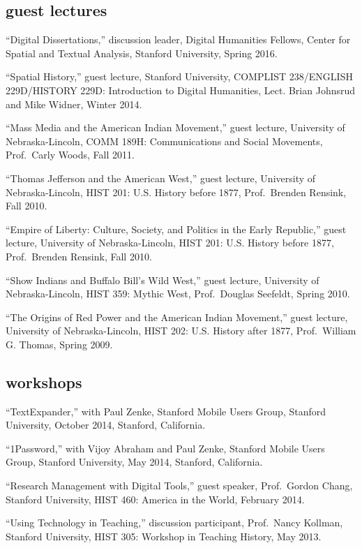 \subsection{guest lectures}\label{guest-lectures}

``Digital Dissertations,'' discussion leader, Digital Humanities
Fellows, Center for Spatial and Textual Analysis, Stanford University,
Spring 2016.

``Spatial History,'' guest lecture, Stanford University, COMPLIST
238/ENGLISH 229D/HISTORY 229D: Introduction to Digital Humanities, Lect.
Brian Johnsrud and Mike Widner, Winter 2014.

``Mass Media and the American Indian Movement,'' guest lecture,
University of Nebraska-Lincoln, COMM 189H: Communications and Social
Movements, Prof.~Carly Woods, Fall 2011.

``Thomas Jefferson and the American West,'' guest lecture, University of
Nebraska-Lincoln, HIST 201: U.S. History before 1877, Prof.~Brenden
Rensink, Fall 2010.

``Empire of Liberty: Culture, Society, and Politics in the Early
Republic,'' guest lecture, University of Nebraska-Lincoln, HIST 201:
U.S. History before 1877, Prof.~Brenden Rensink, Fall 2010.

``Show Indians and Buffalo Bill's Wild West,'' guest lecture, University
of Nebraska-Lincoln, HIST 359: Mythic West, Prof.~Douglas Seefeldt,
Spring 2010.

``The Origins of Red Power and the American Indian Movement,'' guest
lecture, University of Nebraska-Lincoln, HIST 202: U.S. History after
1877, Prof.~William G. Thomas, Spring 2009.

\newpage

\subsection{workshops}\label{workshops}

``TextExpander,'' with Paul Zenke, Stanford Mobile Users Group, Stanford
University, October 2014, Stanford, California.

``1Password,'' with Vijoy Abraham and Paul Zenke, Stanford Mobile Users
Group, Stanford University, May 2014, Stanford, California.

``Research Management with Digital Tools,'' guest speaker, Prof.~Gordon
Chang, Stanford University, HIST 460: America in the World, February
2014.

``Using Technology in Teaching,'' discussion participant, Prof.~Nancy
Kollman, Stanford University, HIST 305: Workshop in Teaching History,
May 2013.

